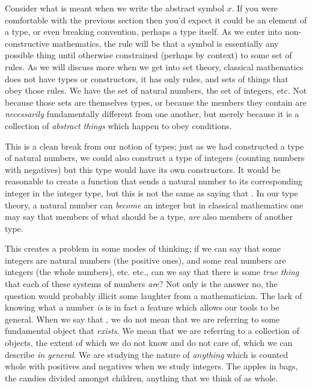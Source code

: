 \documentclass[11pt]{article}
\begin{document}
Consider what is meant when we write the abstract symbol $x$. If you were comfortable with the previous section then you'd expect it could be an element of a type, or even breaking convention, perhaps a type itself. As we enter into non-constructive mathematics, the rule will be that a symbol is essentially any possible thing until otherwise constrained (perhaps by context) to some set of rules. As we will discuss more when we get into set theory, classical mathematics does not have types or constructors, it has only rules, and sets of things that obey those rules. We have the set of natural numbers, the set of integers, etc. Not because those sets are themselves types, or because the members they contain are \emph{necessarily} fundamentally different from one another, but merely because it is a collection of \emph{abstract things} which happen to obey conditions.

This is a clean break from our notion of types; just as we had constructed a type of natural numbers, we could also construct a type of integers (counting numbers with negatives) but this type would have its own constructors. It would be reasonable to create a function that sends a natural number to its corresponding integer in the integer type, but this is not the same as saying that . In our type theory, a natural number can \emph{become} an integer but in classical mathematics one may say that members of what should be a type, \emph{are} also members of another type.

This creates a problem in some modes of thinking; if we can say that some integers are natural numbers (the positive ones), and some real numbers are integers (the whole numbers), etc. etc., can we say that there is some \emph{true thing} that each of these systems of numbers \emph{are}? Not only is the answer no, the question would probably illicit some laughter from a mathematician. The lack of knowing what a number \emph{is} is in fact a feature which allows our tools to be general. When we say that , we do not mean that we are referring to some fundamental object that \emph{exists}. We mean that we are referring to a collection of objects, the extent of which we do not know and do not care of, which we can describe \emph{in general}. We are studying the nature of \emph{anything} which is counted whole with positives and negatives when we study integers. The apples in bags, the candies divided amongst children, anything that we think of as whole.
\end{document}
